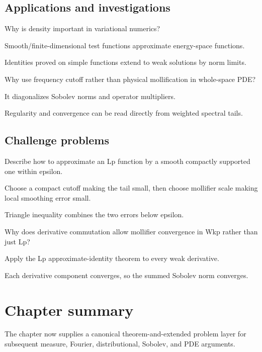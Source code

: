 \subsection*{Applications and investigations}

\begin{exercise}\label{exr:iii22-expand-13}
Why is density important in variational numerics?
\end{exercise}
\begin{hint}
Smooth/finite-dimensional test functions approximate energy-space functions.
\end{hint}
\begin{solution}
Identities proved on simple functions extend to weak solutions by norm limits.
\end{solution}

\begin{exercise}\label{exr:iii22-expand-14}
Why use frequency cutoff rather than physical mollification in whole-space PDE?
\end{exercise}
\begin{hint}
It diagonalizes Sobolev norms and operator multipliers.
\end{hint}
\begin{solution}
Regularity and convergence can be read directly from weighted spectral tails.
\end{solution}

\subsection*{Challenge problems}

\begin{exercise}\label{exr:iii22-expand-15}
Describe how to approximate an Lp function by a smooth compactly supported one within epsilon.
\end{exercise}
\begin{hint}
Choose a compact cutoff making the tail small, then choose mollifier scale making local smoothing error small.
\end{hint}
\begin{solution}
Triangle inequality combines the two errors below epsilon.
\end{solution}

\begin{exercise}\label{exr:iii22-expand-16}
Why does derivative commutation allow mollifier convergence in Wkp rather than just Lp?
\end{exercise}
\begin{hint}
Apply the Lp approximate-identity theorem to every weak derivative.
\end{hint}
\begin{solution}
Each derivative component converges, so the summed Sobolev norm converges.
\end{solution}
\section*{Chapter summary}
The chapter now supplies a canonical theorem-and-extended problem layer for subsequent measure, Fourier, distributional, Sobolev, and PDE arguments.
